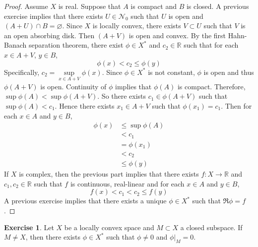 \documentclass[12pt]{amsart}
\theoremstyle{definition}
\newtheorem{ex}[definition]{Exercise}
\newcommand{\R}{\mathbb{R}}
\newcommand{\MN}{\mathcal{N}}
\begin{document}
	\begin{proof}
		Assume $X$ is real. Suppose that $A$ is compact and $B$ is closed. A previous exercise implies that there exists $U \in \MN_0$ such that $U$ is open and $(A + U) \cap B = \varnothing$. Since $X$ is locally convex, there exists $V \subset U$ such that $V$ is an open  absorbing disk. Then $(A + V)$ is open and convex. By the first Hahn-Banach separation theorem, there exist $\phi \in X^*$ and $c_2 \in \R$ such that for each $x \in A + V$, $y \in B$, $$\phi(x) < c_2 \leq \phi(y)$$
		Specifically, $c_2 = \sup\limits_{x \in A + V} \phi(x)$. Since $\phi \in X^*$ is not constant, $\phi$ is open and thus $\phi(A + V)$ is open. Continuity of $\phi$ implies that $\phi(A)$ is compact. Therefore, $\sup \phi(A) < \sup \phi(A + V)$. So there exists $c_1 \in \phi(A + V)$ such that $\sup \phi(A) < c_1$. Hence there exists $x_1 \in A + V$ such that $\phi(x_1) = c_1$. Then for each $x \in A$ and $y \in B$, 
		\begin{align*}
			\phi(x) 
			&\leq \sup \phi(A) \\
			&< c_1 \\
			&= \phi(x_1) \\
			&< c_2 \\
			& \leq \phi(y)
		\end{align*}
	If $X$ is complex, then the previous part implies that there exists $f:X \rightarrow \R$ and $c_1, c_2 \in \R$ such that $f$ is continuous, real-linear and for each $x \in A$ and $y \in B$, 
	$$f(x) < c_1 < c_2 \leq f(y)$$ 
	A previous exercise implies that there exists a unique $\phi \in X^*$ such that $\Re \phi = f$.
	\end{proof}


	\begin{ex}
		Let $X$ be a locally convex space and $M \subset X$ a closed subspace. If $M \neq X$, then there exists $\phi \in X^*$ such that $\phi \neq 0$ and $\phi|_M = 0$. 
	\end{ex}
\end{document}
